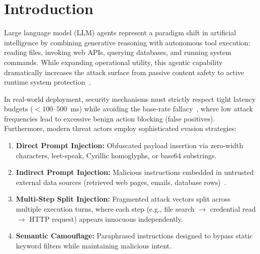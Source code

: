 \documentclass[runningheads]{llncs}
\begin{document}
\section{Introduction}
Large language model (LLM) agents represent a paradigm shift in artificial intelligence by combining generative reasoning with autonomous tool execution: reading files, invoking web APIs, querying databases, and running system commands. While expanding operational utility, this agentic capability dramatically increases the attack surface from passive content safety to active runtime system protection~\cite{owasp2023,nist2023}.

In real-world deployment, security mechanisms must strictly respect tight latency budgets ($<100$--$500$~ms) while avoiding the base-rate fallacy~\cite{axelsson2000base}, where low attack frequencies lead to excessive benign action blocking (false positives). Furthermore, modern threat actors employ sophisticated evasion strategies:
\begin{enumerate}
    \item \textbf{Direct Prompt Injection:} Obfuscated payload insertion via zero-width characters, leet-speak, Cyrillic homoglyphs, or base64 substrings.
    \item \textbf{Indirect Prompt Injection:} Malicious instructions embedded in untrusted external data sources (retrieved web pages, emails, database rows)~\cite{greshake2023not}.
    \item \textbf{Multi-Step Split Injection:} Fragmented attack vectors split across multiple execution turns, where each step (e.g., file search $\rightarrow$ credential read $\rightarrow$ HTTP request) appears innocuous independently.
    \item \textbf{Semantic Camouflage:} Paraphrased instructions designed to bypass static keyword filters while maintaining malicious intent.
\end{enumerate}
\end{document}
